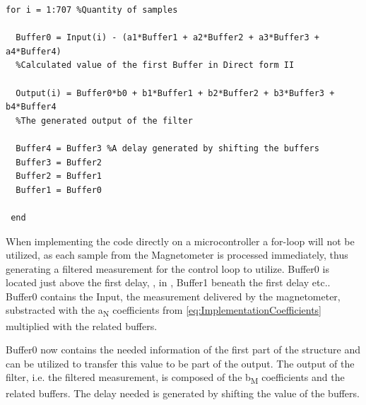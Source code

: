 \begin{lstlisting}
for i = 1:707 %Quantity of samples

  Buffer0 = Input(i) - (a1*Buffer1 + a2*Buffer2 + a3*Buffer3 + a4*Buffer4) 
  %Calculated value of the first Buffer in Direct form II
	
  Output(i) = Buffer0*b0 + b1*Buffer1 + b2*Buffer2 + b3*Buffer3 + b4*Buffer4 
  %The generated output of the filter
    	
  Buffer4 = Buffer3	%A delay generated by shifting the buffers
  Buffer3 = Buffer2
  Buffer2 = Buffer1
  Buffer1 = Buffer0
    
 end
\end{lstlisting}

When implementing the code directly on a microcontroller a for-loop will not be utilized, as each sample from the Magnetometer is processed immediately, thus generating a filtered measurement for the control loop to utilize.
Buffer0 is located just above the first delay, \si{}, in , Buffer1 beneath the first delay etc.. Buffer0 contains the Input, the measurement delivered by the magnetometer, substracted with the \si{a_N} coefficients from \eqref{eq:ImplementationCoefficients} multiplied with the related buffers.

Buffer0 now contains the needed information of the first part of the structure and can be utilized to transfer this value to be part of the output. The output of the filter, i.e. the filtered measurement, is composed of the \si{b_M} coefficients and the related buffers. The delay needed is generated by shifting the value of the buffers.


